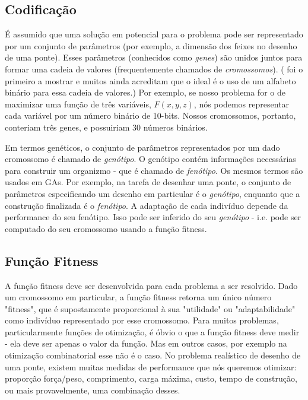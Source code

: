 \subsection{Codificação}
É assumido que uma solução em potencial para o problema pode ser representado por um conjunto de parâmetros (por exemplo, a dimensão dos feixes no desenho de uma ponte). Esses parâmetros (conhecidos como \textit{genes}) são unidos juntos para formar uma cadeia de valores (frequentemente chamados de \textit{cromossomos}). (\cite{Holland1992} foi o primeiro a mostrar e muitos ainda acreditam que o ideal é o uso de um alfabeto binário para essa cadeia de valores.) Por exemplo, se nosso problema for o de maximizar uma função de três variáveis, $F(x,y,z)$, nós podemos representar cada variável por um número binário de 10-bits. Nossos cromossomos, portanto, conteriam três genes, e possuiriam 30 números binários.

Em termos genéticos, o conjunto de parâmetros representados por um dado cromossomo é chamado de \textit{genótipo}. O genótipo contém informações necessárias para construir um organizmo - que é chamado de \textit{fenótipo}. Os mesmos termos são usados em GAs. Por exemplo, na tarefa de desenhar uma ponte, o conjunto de parâmetros especificando um desenho em particular é o \textit{genótipo}, enquanto que a construção finalizada é o \textit{fenótipo}. A adaptação de cada indivíduo depende da performance do seu fenótipo. Isso pode ser inferido do seu \textit{genótipo} - i.e. pode ser computado do seu cromossomo usando a função fitness.

\subsection{Função Fitness}
A função fitness deve ser desenvolvida para cada problema a ser resolvido. Dado um cromossomo em particular, a função fitness retorna um único número "fitness", que é supostamente proporcional à sua "utilidade" ou "adaptabilidade" como indivíduo representado por esse cromossomo. Para muitos problemas, particularmente funções de otimização, é óbvio o que a função fitness deve medir - ela deve ser apenas o valor da função. Mas em outros casos, por exemplo na otimização combinatorial esse não é o caso. No problema realístico de desenho de uma ponte, existem muitas medidas de performance que nós queremos otimizar: proporção força/peso, comprimento, carga máxima, custo, tempo de construção, ou mais provavelmente, uma combinação desses. \cite{Beasley1993}

